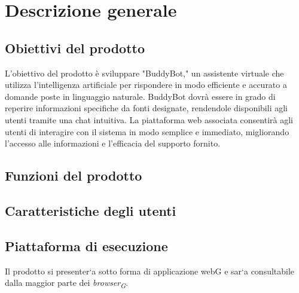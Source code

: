  


\section{Descrizione generale}

\subsection{Obiettivi del prodotto}
L'obiettivo del prodotto è sviluppare "BuddyBot," un assistente virtuale che utilizza l'intelligenza artificiale 
per rispondere in modo efficiente e accurato a domande poste in linguaggio naturale. BuddyBot dovrà essere in grado 
di reperire informazioni specifiche da fonti designate, rendendole disponibili agli utenti tramite una chat intuitiva. 
La piattaforma web associata consentirà agli utenti di interagire con il sistema in modo semplice e immediato, migliorando
l'accesso alle informazioni e l'efficacia del supporto fornito.

\subsection{Funzioni del prodotto}


\subsection{Caratteristiche degli utenti}
\subsection{Piattaforma di esecuzione}
Il prodotto si presenter`a sotto forma di applicazione webG e sar`a consultabile dalla maggior
parte dei \textit{browser\textsubscript{G}}.